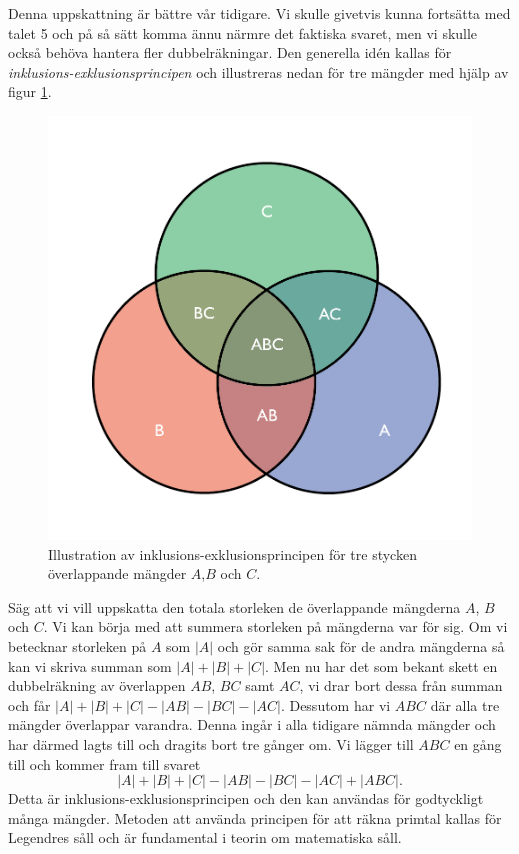 Denna uppskattning är bättre vår tidigare. 
Vi skulle givetvis kunna fortsätta med talet 5 och på så sätt komma ännu närmre det faktiska svaret, 
men vi skulle också behöva hantera fler dubbelräkningar.
Den generella idén kallas för \textit{inklusions-exklusionsprincipen} och illustreras nedan för tre mängder med hjälp av figur \ref{pop.fig}.
\begin{figure}[H]
    \centering
    \includegraphics[scale=0.3]{erik/Images/Venndiagram.pdf}
    \caption{Illustration av inklusions-exklusionsprincipen för tre stycken överlappande mängder $A$,$B$ och $C$.}
    \label{pop.fig}
\end{figure}
Säg att vi vill uppskatta den totala storleken de överlappande mängderna $A$, $B$ och $C$. 
Vi kan börja med att summera storleken på mängderna var för sig.
Om vi betecknar storleken på $A$ som $|A|$ och gör samma sak för de andra mängderna så kan vi skriva summan som $|A|+|B|+|C|$.
Men nu har det som bekant skett en dubbelräkning av överlappen $AB$, $BC$ samt $AC$, vi drar bort dessa från summan och får $|A|+|B|+|C|-|AB|-|BC|-|AC|$.
Dessutom har vi $ABC$ där alla tre mängder överlappar varandra.
Denna ingår i alla tidigare nämnda mängder och har därmed lagts till och dragits bort tre gånger om. 
Vi lägger till $ABC$ en gång till och kommer fram till svaret
\begin{equation*}
    |A|+|B|+|C|-|AB|-|BC|-|AC|+|ABC|.
\end{equation*}
Detta är inklusions-exklusionsprincipen och den kan användas för godtyckligt många mängder.
Metoden att använda principen för att räkna primtal kallas för Legendres såll och är fundamental i teorin om matematiska såll.


